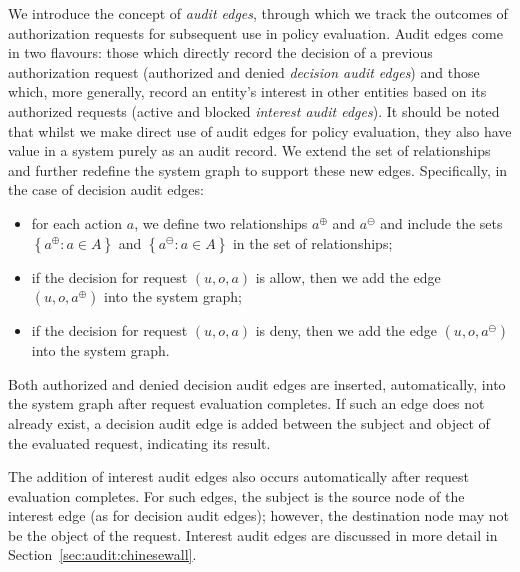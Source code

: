 \documentclass{article}
\newcommand{\set}[1]{\ensuremath{\left\{#1\right\}}} \newcommand{\sett}[1]{\ensuremath{\left\{\textit{#1}\right\}}} \newcommand{\tuple}[1]{\ensuremath{\left(#1\right)}} \newcommand{\tuplet}[1]{\ensuremath{\left(\textit{#1}\right)}}
\newcommand{\audita}[1]{\ensuremath{#1^\oplus}}
\newcommand{\auditd}[1]{\ensuremath{#1^\ominus}}
\begin{document}
We introduce the concept of \emph{audit edges}, through which we track the outcomes of authorization requests for subsequent use in policy evaluation.
Audit edges come in two flavours: those which directly record the decision of a previous authorization request (authorized and denied \emph{decision audit edges}) and those which, more generally, record an entity's interest in other entities based on its authorized requests (active and blocked \emph{interest audit edges}).
It should be noted that whilst we make direct use of audit edges for policy evaluation, they also have value in a system purely as an audit record.
We extend the set of relationships and further redefine the system graph to support these new edges.
Specifically, in the case of decision audit edges:
\begin{itemize}
    \item for each action $a$, we define two relationships $\audita{a}$ and $\auditd{a}$ and include the sets $\set{\audita{a} : a \in A}$ and $\set{\auditd{a} : a \in A}$ in the set of relationships;
    \item if the decision for request $(u,o,a)$ is allow, then we add the edge $(u,o,\audita{a})$ into the system graph;
    \item if the decision for request $(u,o,a)$ is deny, then we add the edge $(u,o,\auditd{a})$ into the system graph.
\end{itemize}

Both authorized and denied decision audit edges are inserted, automatically, into the system graph after request evaluation completes.
If such an edge does not already exist, a decision audit edge is added between the subject and object of the evaluated request, indicating its result.

The addition of interest audit edges also occurs automatically after request evaluation completes.
For such edges, the subject is the source node of the interest edge (as for decision audit edges); however, the destination node may not be the object of the request.
Interest audit edges are discussed in more detail in Section~\ref{sec:audit:chinesewall}.
\end{document}
